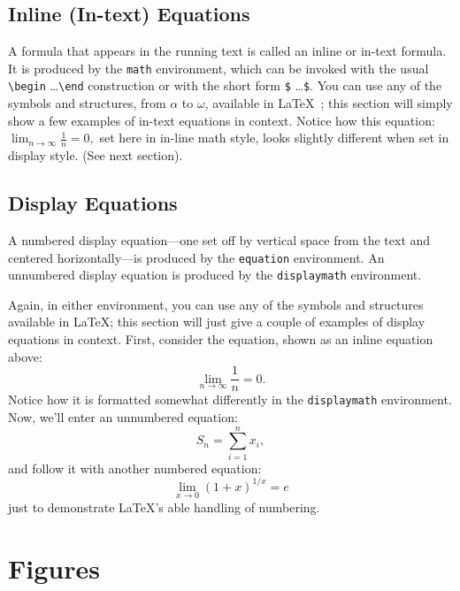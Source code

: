 \documentclass[
]{ceurart}
\begin{document}
\subsection{Inline (In-text) Equations}

A formula that appears in the running text is called an inline or
in-text formula.  It is produced by the \verb|math| environment,
which can be invoked with the usual
\verb|\begin| \ldots \verb|\end| construction or with
the short form \verb|$| \ldots \verb|$|. You can use any of the symbols
and structures, from $\alpha$ to $\omega$, available in
\LaTeX~\cite{Lamport:LaTeX};
this section will simply show a few
examples of in-text equations in context. Notice how this equation:
\begin{math}
  \lim_{n\rightarrow \infty} \frac{1}{n} = 0,
\end{math}
set here in in-line math style, looks slightly different when
set in display style.  (See next section).

\subsection{Display Equations}

A numbered display equation---one set off by vertical space from the
text and centered horizontally---is produced by the \verb|equation|
environment. An unnumbered display equation is produced by the
\verb|displaymath| environment.

Again, in either environment, you can use any of the symbols and
structures available in \LaTeX{}; this section will just give a couple
of examples of display equations in context.  First, consider the
equation, shown as an inline equation above:
\begin{equation}
  \lim_{n\rightarrow \infty} \frac{1}{n} = 0.
\end{equation}
Notice how it is formatted somewhat differently in
the \verb|displaymath|
environment.  Now, we'll enter an unnumbered equation:
\begin{displaymath}
  S_{n} = \sum_{i=1}^{n} x_{i} ,
\end{displaymath}
and follow it with another numbered equation:
\begin{equation}
  \lim_{x \to 0} (1 + x)^{1/x} = e
\end{equation}
just to demonstrate \LaTeX's able handling of numbering.

\section{Figures}
\end{document}
